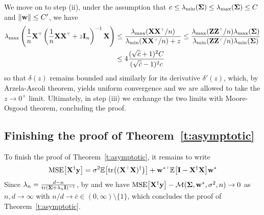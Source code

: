 We move on to step (ii), under the assumption that $c \le \lambda_{\min} (\mathbf{\Sigma}) \le \lambda_{\max} (\mathbf{\Sigma}) \le C$ and $\| \mathbf w \| \le C'$, we have
\begin{align*}
  \lambda_{\max} \left( \frac1n \X^\top \left( \frac1n \X \X^\top + z \I_n \right)^{-1} \X \right) &\le \frac{ \lambda_{\max} (\X \X^\top/n) }{ \lambda_{\min} (\X \X^\top/n) + z } \le \frac{ \lambda_{\max} (\Z \Z^\top/n) \lambda_{\max} (\Sigmab) }{ \lambda_{\min} (\Z \Z^\top/n) \lambda_{\min} (\Sigmab) } \\
  &\le 4 \frac{ (\sqrt{\bar c} + 1)^2 C }{ (\sqrt{\bar c} -1)^2 c }
\end{align*}
so that $\delta(z)$ remains bounded and similarly for its derivative
$\delta'(z)$, which, by Arzela-Ascoli theorem, yields uniform
convergence and we are allowed to take the $z \to 0^+$
limit. Ultimately, in step (iii) we exchange the two limits with
Moore-Osgood theorem, concluding the proof.

\subsection{Finishing the proof of Theorem~\ref{t:asymptotic}}

To finish the proof of Theorem~\ref{t:asymptotic}, it remains to write
\[
  \MSE{\X^\dagger\y} = \sigma^2\E\big[\tr\big((\X^\top\X)^{\dagger}\big)\big] +
    \w^{*\top}\E\big[\I-\X^\dagger\X\big]\w^*
\]
Since $\lambda_n = \frac{d-n}{ \mathrm{tr} (\mathbf{\Sigma} + \lambda_n \mathbf I)^{-1} }$,
by  and  we have
${\mathrm{MSE}\big[\mathbf X^\dagger\mathbf y\big]} - \mathcal M(\mathbf{\Sigma}, \mathbf w^*, \sigma^2, n) \to 0$ as $n,d
\to \infty$ with $n/d \to \bar c \in (0,\infty) \setminus \{ 1 \}$,
which concludes the proof of Theorem~\ref{t:asymptotic}.


